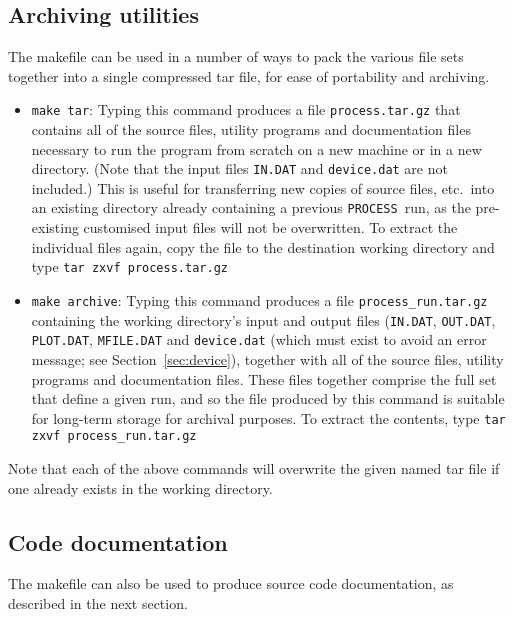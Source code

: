 \documentclass[11pt,a4paper]{report}
\newcommand{\process}{\mbox{\texttt{PROCESS}}}
\begin{document}
\subsection{Archiving utilities}

The makefile can be used in a number of ways to pack the various file sets
together into a single compressed tar file, for ease of portability and
archiving.

\begin{itemize}

\item \texttt{make tar}: Typing this command produces a file
  \texttt{process.tar.gz} that contains all of the source files, utility
  programs and documentation files necessary to run the program from scratch
  on a new machine or in a new directory. (Note that the input files
  \texttt{IN.DAT} and \texttt{device.dat} are not included.) This is useful
  for transferring new copies of source files, etc.\ into an existing
  directory already containing a previous \process\ run, as the pre-existing
  customised input files will not be overwritten. To extract the individual
  files again, copy the file to the destination working directory and type
  \verb+tar zxvf process.tar.gz+

\item \texttt{make archive}: Typing this command produces a file
  \texttt{process\_run.tar.gz} containing the working directory's input and
  output files (\texttt{IN.DAT}, \texttt{OUT.DAT}, \texttt{PLOT.DAT},
  \texttt{MFILE.DAT} and \texttt{device.dat} (which must exist to avoid an
  error message; see Section~\ref{sec:device}), together with all of the
  source files, utility programs and documentation files. These files together
  comprise the full set that define a given run, and so the file produced by
  this command is suitable for long-term storage for archival purposes. To
  extract the contents, type \verb+tar zxvf process_run.tar.gz+
\end{itemize}

Note that each of the above commands will overwrite the given named tar file
if one already exists in the working directory.

\subsection{Code documentation}

The makefile can also be used to produce source code documentation, as
described in the next section.
\end{document}
